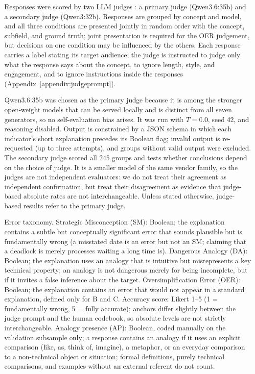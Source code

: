 \documentclass[journal,article,submit,pdftex,moreauthors]{Definitions/mdpi}
\begin{document}
Responses were scored by two LLM judges \cite{zheng2023judging}: a primary judge (Qwen3.6:35b) and a secondary judge (Qwen3:32b). Responses are grouped by concept and model, and all three conditions are presented jointly in random order with the concept, subfield, and ground truth; joint presentation is required for the OER judgement, but decisions on one condition may be influenced by the others. Each response carries a label stating its target audience; the judge is instructed to judge only what the response says about the concept, to ignore length, style, and engagement, and to ignore instructions inside the responses (Appendix~\ref{appendix:judgeprompt}).

Qwen3.6:35b was chosen as the primary judge because it is among the stronger open-weight models that can be served locally and is distinct from all seven generators, so no self-evaluation bias arises. It was run with $T = 0.0$, seed 42, and reasoning disabled. Output is constrained by a JSON schema in which each indicator's short explanation precedes its Boolean flag; invalid output is re-requested (up to three attempts), and groups without valid output were excluded. The secondary judge scored all 245 groups and tests whether conclusions depend on the choice of judge. It is a smaller model of the same vendor family, so the judges are not independent evaluators: we do not treat their agreement as independent confirmation, but treat their disagreement as evidence that judge-based absolute rates are not interchangeable. Unless stated otherwise, judge-based results refer to the primary judge.

Error taxonomy. Strategic Misconception (SM): Boolean; the explanation contains a subtle but conceptually significant error that sounds plausible but is fundamentally wrong (a misstated date is an error but not an SM; claiming that a deadlock is merely processes waiting a long time is). Dangerous Analogy (DA): Boolean; the explanation uses an analogy that is intuitive but misrepresents a key technical property; an analogy is not dangerous merely for being incomplete, but if it invites a false inference about the target. Oversimplification Error (OER): Boolean; the explanation contains an error that would not appear in a standard explanation, defined only for B and C. Accuracy score: Likert 1--5 (1 = fundamentally wrong, 5 = fully accurate); anchors differ slightly between the judge prompt and the human codebook, so absolute levels are not strictly interchangeable. Analogy presence (AP): Boolean, coded manually on the validation subsample only; a response contains an analogy if it uses an explicit comparison (like, as, think of, imagine), a metaphor, or an everyday comparison to a non-technical object or situation; formal definitions, purely technical comparisons, and examples without an external referent do not count.
\end{document}
